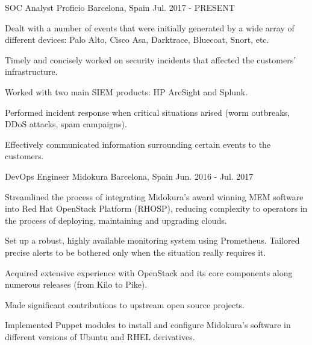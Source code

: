 

\begin{cventries}

  \cventry
    {SOC Analyst} %
    {Proficio} %
    {Barcelona, Spain} %
    {Jul. 2017 - PRESENT} %
    {
      \begin{cvitems} %
        \item {Dealt with a number of events that were initially generated by a wide array of different devices: Palo Alto, Cisco Asa, Darktrace, Bluecoat, Snort, etc.}
        \item {Timely and concisely worked on security incidents that affected the customers' infrastructure.}
        \item {Worked with two main SIEM products: HP ArcSight and Splunk.}
        \item {Performed incident response when critical situations arised (worm outbreaks, DDoS attacks, spam campaigns).}
        \item {Effectively communicated information surrounding certain events to the customers.}
      \end{cvitems}
    }

  \cventry
    {DevOps Engineer} %
    {Midokura} %
    {Barcelona, Spain} %
    {Jun. 2016 - Jul. 2017} %
    {
      \begin{cvitems} %
        \item {Streamlined the process of integrating Midokura’s award winning MEM software into Red Hat OpenStack Platform (RHOSP), reducing complexity to operators in the process of deploying, maintaining and upgrading clouds.}
        \item {Set up a robust, highly available monitoring system using Prometheus. Tailored precise alerts to be bothered only when the situation really requires it.}
        \item {Acquired extensive experience with OpenStack and its core components along numerous releases (from Kilo to Pike).}
        \item {Made significant contributions to upstream open source projects.}
        \item {Implemented Puppet modules to install and configure Midokura’s software in different versions of Ubuntu and RHEL derivatives.}
      \end{cvitems}
    }


\end{cventries}
